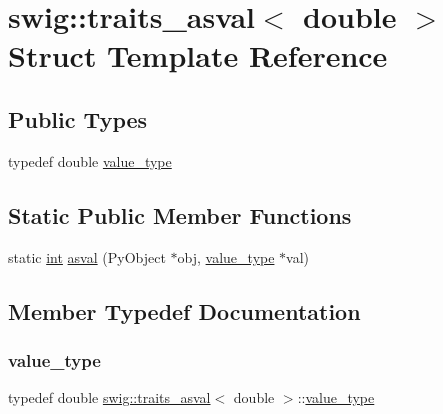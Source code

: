 \hypertarget{structswig_1_1traits__asval_3_01double_01_4}{}\section{swig\+:\+:traits\+\_\+asval$<$ double $>$ Struct Template Reference}
\label{structswig_1_1traits__asval_3_01double_01_4}
\subsection*{Public Types}
\begin{DoxyCompactItemize}
\item 
typedef double \hyperlink{structswig_1_1traits__asval_3_01double_01_4_acc549718ce52880c4368a2e37f3ff544}{value\+\_\+type}
\end{DoxyCompactItemize}
\subsection*{Static Public Member Functions}
\begin{DoxyCompactItemize}
\item 
static \hyperlink{lp__lib_8h_adeb9ec6400320e4923ac9d836d509ddb}{int} \hyperlink{structswig_1_1traits__asval_3_01double_01_4_aa2b3a8491625ce70a1bb03c1cc851d9a}{asval} (Py\+Object $\ast$obj, \hyperlink{structswig_1_1traits__asval_3_01double_01_4_acc549718ce52880c4368a2e37f3ff544}{value\+\_\+type} $\ast$val)
\end{DoxyCompactItemize}


\subsection{Member Typedef Documentation}
\mbox{\label{structswig_1_1traits__asval_3_01double_01_4_acc549718ce52880c4368a2e37f3ff544}} 
\subsubsection{\texorpdfstring{value\+\_\+type}{value\_type}}
{\footnotesize\ttfamily typedef double \hyperlink{structswig_1_1traits__asval}{swig\+::traits\+\_\+asval}$<$ double $>$\+::\hyperlink{structswig_1_1traits__asval_3_01double_01_4_acc549718ce52880c4368a2e37f3ff544}{value\+\_\+type}}



